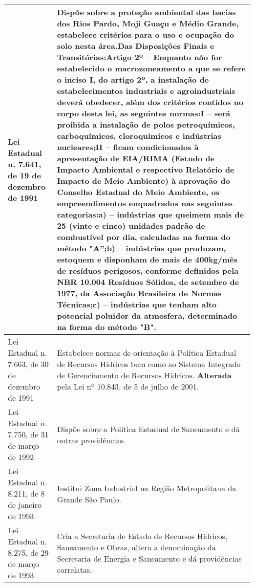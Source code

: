 \begin{center}
\begin{longtable}{|p{}|p{}|}
			\hline
			Lei Estadual n. 7.641, de 19 de dezembro de 1991 & Dispõe  sobre  a proteção  ambiental  das  bacias  dos  Rios  Pardo,  Moji  Guaçu  e Médio Grande, estabelece critérios para o uso e ocupação do solo nesta área.\newline{}Das Disposições Finais e Transitórias:\newline{}Artigo 2º – Enquanto não for estabelecido o macrozoneamento a que se refere o inciso   I,   do   artigo   2º,   a   instalação   de   estabelecimentos   industriais   e agroindustriais deverá obedecer, além dos critérios contidos no corpo desta lei, as seguintes normas:\newline{}I   –   será   proibida   a   instalação   de   polos   petroquímicos,   carboquímicos, cloroquímicos e indústrias nucleares;\newline{}II  –  ficam  condicionados  à  apresentação  de  EIA/RIMA  (Estudo  de  Impacto Ambiental e respectivo Relatório de Impacto de Meio Ambiente) à aprovação do Conselho  Estadual  do  Meio  Ambiente,  os  empreendimentos  enquadrados  nas seguintes categorias:\newline{}a)  –  indústrias  que  queimem  mais  de  25  (vinte  e  cinco)  unidades  padrão  de combustível por dia, calculadas na forma do método "A”;\newline{}b) – indústrias que produzam, estoquem e disponham de mais de 400kg/mês de resíduos perigosos, conforme definidos pela NBR 10.004 Resíduos Sólidos, de setembro de 1977, da Associação Brasileira de Normas Técnicas;\newline{}c) – indústrias que tenham alto potencial poluidor da atmosfera, determinado na forma do método "B". \\
			\hline
			Lei Estadual n. 7.663, de 30 de dezembro de 1991 & Estabelece normas de orientação à Política Estadual de Recursos Hídricos bem como ao Sistema Integrado de Gerenciamento de Recursos Hídricos. \textbf{Alterada} pela Lei nº 10.843, de 5 de julho de 2001. \\
			\hline
			Lei Estadual n. 7.750, de 31 de março de 1992 & Dispõe sobre a Política Estadual de Saneamento e dá outras providências. \\
			\hline
			Lei Estadual n. 8.211, de 8 de janeiro de 1993 & Institui Zona Industrial na Região Metropolitana da Grande São Paulo. \\
			\hline
			Lei Estadual n. 8.275, de 29 de março de 1993 & Cria a Secretaria de Estado de Recursos Hídricos, Saneamento e Obras, altera a  denominação  da  Secretaria  de  Energia  e  Saneamento  e  dá  providências correlatas. \\

\end{longtable}
\end{center}
